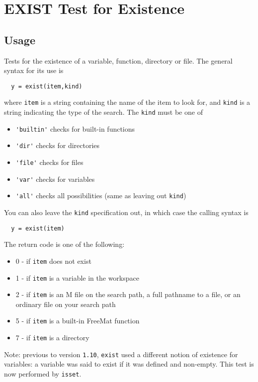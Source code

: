 \section{EXIST Test for Existence}

\subsection{Usage}

Tests for the existence of a variable, function, directory or
file.  The general syntax for its use is
\begin{verbatim}
  y = exist(item,kind)
\end{verbatim}
where \verb|item| is a string containing the name of the item
to look for, and \verb|kind| is a string indicating the type 
of the search.  The \verb|kind| must be one of 
\begin{itemize}
\item  \verb|'builtin'| checks for built-in functions

\item  \verb|'dir'| checks for directories

\item  \verb|'file'| checks for files

\item  \verb|'var'| checks for variables

\item  \verb|'all'| checks all possibilities (same as leaving out \verb|kind|)

\end{itemize}
You can also leave the \verb|kind| specification out, in which case
the calling syntax is
\begin{verbatim}
  y = exist(item)
\end{verbatim}
The return code is one of the following:
\begin{itemize}
\item  0 - if \verb|item| does not exist

\item  1 - if \verb|item| is a variable in the workspace

\item  2 - if \verb|item| is an M file on the search path, a full pathname
 to a file, or an ordinary file on your search path

\item  5 - if \verb|item| is a built-in FreeMat function

\item  7 - if \verb|item| is a directory

\end{itemize}
Note: previous to version \verb|1.10|, \verb|exist| used a different notion
of existence for variables: a variable was said to exist if it 
was defined and non-empty.  This test is now performed by \verb|isset|.
